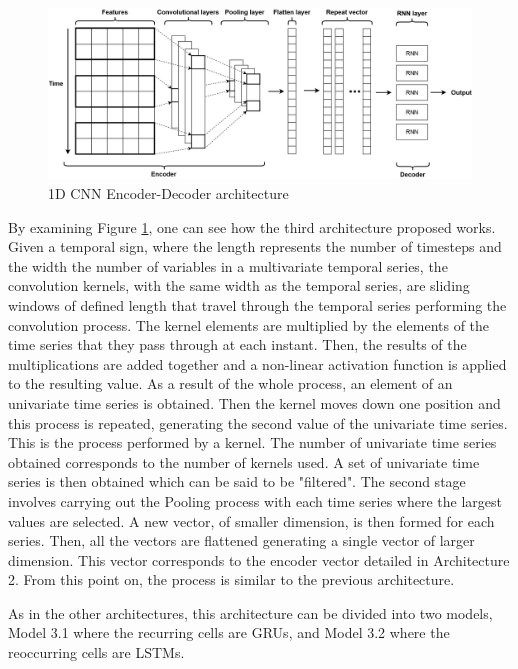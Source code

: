\begin{figure}[h!]
    \centering
    \begin{center}
    \includegraphics[width=1\textwidth]{Images/ED.png}
    \caption{1D CNN Encoder-Decoder architecture}
    \label{arc3}
    \end{center}
\end{figure}

By examining Figure \ref{arc3}, one can see how the third architecture proposed works. Given a temporal sign, where the length represents the number of timesteps and the width the number of variables in a multivariate temporal series, the convolution kernels, with the same width as the temporal series, are sliding windows of defined length that travel through the temporal series performing the convolution process. The kernel elements are multiplied by the elements of the time series that they pass through at each instant. Then, the results of the multiplications are added together and a non-linear activation function is applied to the resulting value. As a result of the whole process, an element of an univariate time series is obtained. Then the kernel moves down one position and this process is repeated, generating the second value of the univariate time series. This is the process performed by a kernel. The number of univariate time series obtained corresponds to the number of kernels used. A set of univariate time series is then obtained which can be said to be "filtered". The second stage involves carrying out the Pooling process with each time series where the largest values are selected. A new vector, of smaller dimension, is then formed for each series. Then, all the vectors are flattened generating a single vector of larger dimension. This vector corresponds to the encoder vector detailed in Architecture 2. From this point on, the process is similar to the previous architecture. 

As in the other architectures, this architecture can be divided into two models, Model 3.1 where the recurring cells are \ac{GRU}s, and Model 3.2 where the reoccurring cells are \ac{LSTM}s. 



